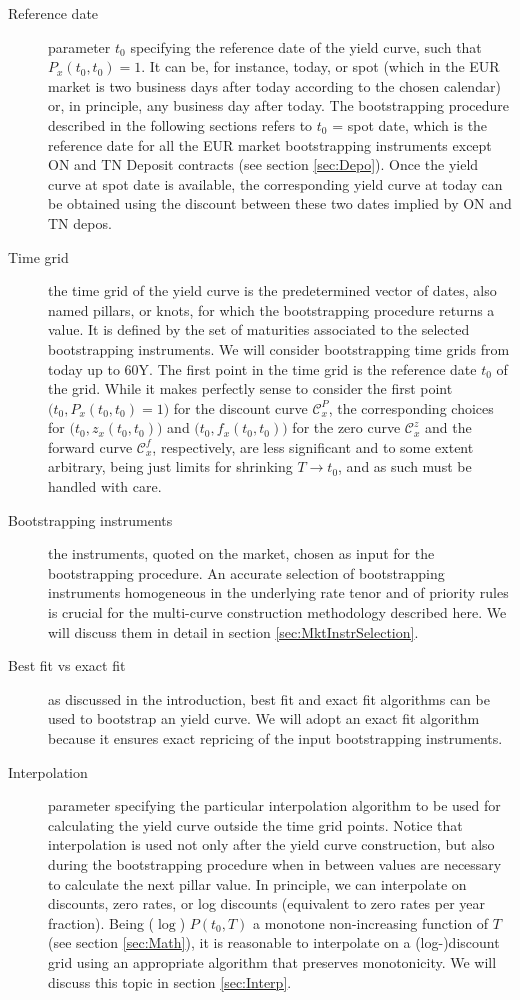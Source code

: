 \documentclass[11pt,reqno]{amsart}
\begin{document}
\begin{description}
  \item[Reference date] parameter $t_0$ specifying the reference date of the yield curve, such that $P_x\left(t_0,t_0\right)=1$. It can be, for instance, today, or spot (which in the EUR market is two business days after today according to the chosen calendar) or, in principle, any business day after today. The bootstrapping procedure described in the following sections refers to $t_0$ = spot date, which is the reference date for all the EUR market bootstrapping instruments except ON and TN Deposit contracts (see section \ref{sec:Depo}). Once the yield curve at spot date is available, the corresponding yield curve at today can be obtained using the discount between these two dates implied by ON and TN depos.
  \item[Time grid] the time grid of the yield curve is the predetermined vector of dates, also named pillars, or knots, for which the bootstrapping procedure returns a value. It is defined by the set of maturities associated to the selected bootstrapping instruments. We will consider bootstrapping time grids from today up to 60Y. The first point in the time grid is the reference date $t_0$ of the grid. While it makes perfectly sense to consider the first point $\bigl(t_0,P_x(t_0,t_0)=1\bigr)$ for the discount curve $\mathcal{C}_x^P$, the corresponding choices for $\bigl(t_0,z_x\left(t_0,t_0\right)\bigr)$ and $\bigl(t_0,f_x\left(t_0,t_0\right)\bigr)$ for the zero curve $\mathcal{C}_x^z$ and the forward curve $\mathcal{C}_x^f$, respectively, are less significant and to some extent arbitrary, being just limits for shrinking $T\rightarrow t_0$, and as such must be handled with care.
  \item[Bootstrapping instruments] the instruments, quoted on the market, chosen as input for the bootstrapping procedure. An accurate selection of bootstrapping instruments homogeneous in the underlying rate tenor and of priority rules is crucial for the multi-curve construction methodology described here. We will discuss them in detail in section \ref{sec:MktInstrSelection}.
  \item[Best fit vs exact fit] as discussed in the introduction, best fit and exact fit algorithms can be used to bootstrap an yield curve. We will adopt an exact fit algorithm because it ensures exact repricing of the input bootstrapping instruments.
  \item[Interpolation] parameter specifying the particular interpolation algorithm to be used for calculating the yield curve outside the time grid points. Notice that interpolation is used not only after the yield curve construction, but also during the bootstrapping procedure when in between values are necessary to calculate the next pillar value. In principle, we can interpolate on discounts, zero rates, or log discounts (equivalent to zero rates per year fraction). Being ($\log $) $P(t_0,T)$ a monotone non-increasing function of $T$ (see section \ref{sec:Math}), it is reasonable to interpolate on a (log-)discount grid using an appropriate algorithm that preserves monotonicity. We will discuss this topic in section \ref{sec:Interp}.

\end{description}
\end{document}
